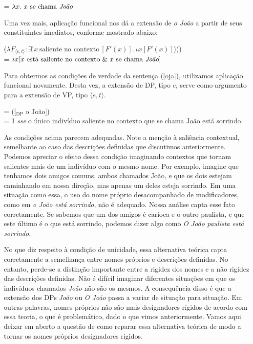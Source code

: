 \begin{exe}
	\ex {} = $\lambda x.\ x\ \text{se chama \textit{João}}$
\end{exe}

\n Uma vez mais, aplicação funcional nos dá a extensão de \textit{o João} a partir de seus constituintes imediatos, conforme mostrado abaixo:

\begin{exe}
	\ex ($\lambda F_{\langle e,t\rangle}:\exists !x\ \text{saliente no contexto}\ [F'(x)].\ \iota x[F'(x)]$)() \\
	= $\iota x[x\ \text{está saliente no contexto}\ \&\ x\ \text{se chama \textit{João}}]$
\end{exe}

\n Para obtermos as condições de verdade da sentença (\ref{oja}),
utilizamos aplicação funcional novamente. Desta vez, a extensão de
DP, tipo e, serve como argumento para a extensão de VP, tipo
$\langle e,t\rangle$.

\begin{exe}
	\ex {} = ([$_{\text{DP}}$ o João]) \\
	 = 1 \textit{sse} o único indivíduo saliente no contexto que se chama João está sorrindo.
\end{exe}

\n As condições acima parecem adequadas. Note a menção à saliência
contextual, semelhante ao caso das descrições definidas que
discutimos anteriormente. Podemos apreciar o efeito dessa condição
imaginando contextos que tornam salientes mais de um indivíduo com
o mesmo nome. Por exemplo, imagine que tenhamos dois amigos
comuns, ambos chamados João, e que os dois estejam caminhando em
nossa direção, mas apenas um deles esteja sorrindo. Em uma
situação como essa, o uso do nome próprio desacompanhado de
modificadores, como em \textit{o João está sorrindo}, não é adequado.
Nossa análise capta esse fato corretamente. Se sabemos que um
dos amigos é carioca e o outro paulista, e que este último é o que
está sorrindo, podemos dizer algo como \textit{O João paulista está
sorrindo}.

No que diz respeito à condição de unicidade, essa alternativa teórica capta corretamente a semelhança entre nomes próprios e descrições definidas. No entanto, perde-se a distinção importante entre a rigidez dos nomes e a não rigidez das descrições definidas. Não é difícil imaginar
diferentes situações em que os indivíduos chamados \textit{João}
não são os mesmos. A consequência disso é que a extensão dos DPs
\textit{João} ou \textit{O João} passa a variar de situação para situação. Em
outras palavras, nomes próprios não são mais designadores rígidos
de acordo com essa teoria, o que é problemático, dado o que vimos
anteriormente. Vamos aqui deixar em aberto a questão de como reparar
essa alternativa teórica de modo a tornar os nomes próprios
designadores rígidos.

